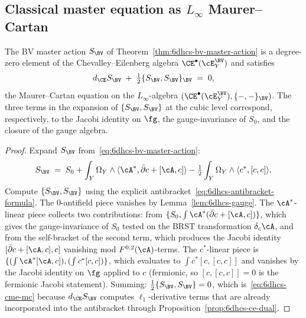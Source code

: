 \subsection{Classical master equation as $L_\infty$ Maurer--Cartan}
\label{subsec:vol2-bvbrst-6dhcs-cme-mc}

\begin{theorem}
\label{thm:6dhcs-cme-is-mc}
The BV master action $S_{\BV}$ of
Theorem~\ref{thm:6dhcs-bv-master-action} is a degree-zero element of
the Chevalley--Eilenberg algebra $\CE^\bullet(\cE^{\BV}_Y)$ and
satisfies
\begin{equation}\label{eq:6dhcs-cme-mc}
 d_{\CE} S_{\BV} \;+\; \tfrac12\{S_{\BV},S_{\BV}\}_{\BV} \;=\; 0,
\end{equation}
the Maurer--Cartan equation on the $L_\infty$-algebra
$(\CE^\bullet(\cE^{\BV}_Y),\{-,-\}_{\BV})$. The three terms in the
expansion of $\{S_{\BV},S_{\BV}\}$ at the cubic level correspond,
respectively, to the Jacobi identity on $\fg$, the gauge-invariance
of $S_0$, and the closure of the gauge algebra.
\end{theorem}

\begin{proof}
Expand $S_{\BV}$ from~\eqref{eq:6dhcs-bv-master-action}:
\[
 S_{\BV} \;=\; S_0 + \int_Y\Omega_Y\wedge
 \langle\cA^*,\bar\partial c + [\cA,c]\rangle
 - \tfrac12\int_Y\Omega_Y\wedge\langle c^*,[c,c]\rangle.
\]
Compute $\{S_{\BV},S_{\BV}\}$ using the explicit
antibracket~\eqref{eq:6dhcs-antibracket-formula}. The
$0$-antifield piece vanishes by Lemma~\ref{lem:6dhcs-gauge}. The
$\cA^*$-linear piece collects two contributions: from
$\{S_0,\int\cA^*(\bar\partial c + [\cA,c])\}$, which gives the
gauge-invariance of $S_0$ tested on the BRST transformation
$\delta_c\cA$, and from the self-bracket of the second term, which
produces the Jacobi identity $[\bar\partial c + [\cA,c],c]$
vanishing mod $F^{0,2}(\cA)$-terms. The $c^*$-linear piece is
$\{(\int\cA^*[\cA,c]),(\int c^*[c,c])\}$, which evaluates to
$\int c^*[c,[c,c]]$ and vanishes by the Jacobi identity on
$\fg$ applied to $c$ (fermionic, so $[c,[c,c]] = 0$ is the
fermionic Jacobi statement). Summing:
$\tfrac12\{S_{\BV},S_{\BV}\} = 0$, which
is~\eqref{eq:6dhcs-cme-mc} because $d_{\CE}S_{\BV}$ computes
$\ell_1$-derivative terms that are already incorporated into the
antibracket through
Proposition~\ref{prop:6dhcs-ce-dual}.
\end{proof}

